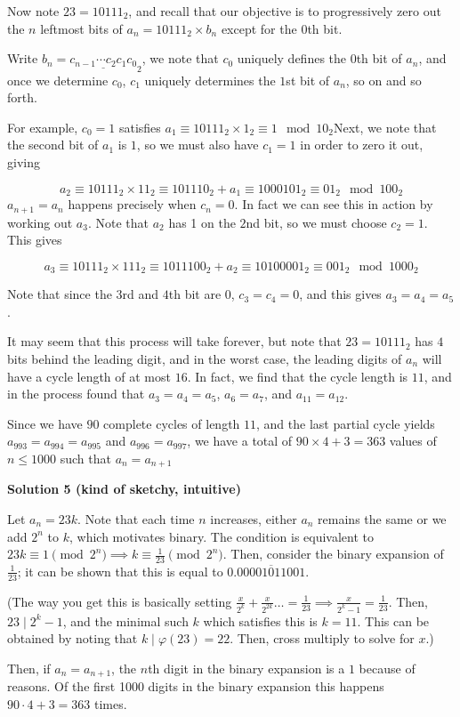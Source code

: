 \begin{enumerate}
 Now note $23 = 10111_2$, and recall that our objective is to progressively zero out the $n$ leftmost bits of $a_n = 10111_2 \times b_n$ except for the $0$th bit. 

 Write $b_n = \underline{c_{n-1}\cdots c_2c_1c_0}_2$, we note that $c_0$ uniquely defines the $0$th bit of $a_n$, and once we determine $c_0$, $c_1$ uniquely determines the $1$st bit of $a_n$, so on and so forth. 

 For example, $c_0 = 1$ satisfies $a_1 \equiv10111_2 \times 1_2 \equiv 1 \mod{10_2}$Next, we note that the second bit of $a_1$ is $1$, so we must also have $c_1 = 1$ in order to zero it out, giving

 
 \[a_2 \equiv 10111_2 \times 11_2 \equiv 101110_2 + a_1 \equiv 1000101_2 \equiv 01_2 \mod{100_2}\]
$a_{n+1} = a_{n}$ happens precisely when $c_n = 0$. In fact we can see this in action by working out $a_3$. Note that $a_2$ has 1 on the $2$nd bit, so we must choose $c_2 = 1$. This gives 

 
 \[a_3 \equiv 10111_2 \times 111_2 \equiv 1011100_2 + a_2 \equiv 10100001_2 \equiv 001_2 \mod{1000_2}\]

 Note that since the $3$rd and $4$th bit are $0$, $c_3 = c_4 = 0$, and this gives $a_3 = a_4 = a_5$.

 
It may seem that this process will take forever, but note that $23 = 10111_2$ has $4$ bits behind the leading digit, and in the worst case, the leading digits of $a_n$ will have a cycle length of at most $16$. In fact, we find that the cycle length is $11$, and in the process found that $a_3 = a_4 = a_5$, $a_6 = a_7$, and $a_{11} = a_{12}$.

 Since we have $90$ complete cycles of length $11$, and the last partial cycle yields $a_{993} = a_{994} = a_{995}$ and $a_{996} = a_{997}$, we have a total of $90 \times 4 + 3 = \boxed{363}$ values of $n \le 1000$ such that $a_n = a_{n+1}$




\textbf{Solution 5 (kind of sketchy, intuitive)}

Let $a_n=23k$. Note that each time $n$ increases, either $a_n$ remains the same or we add $2^n$ to $k$, which motivates binary. The condition is equivalent to $23k \equiv 1 \pmod{2^n} \implies k \equiv \frac{1}{23} \pmod{2^n}$. Then, consider the binary expansion of $\frac{1}{23}$; it can be shown that this is equal to $0.\overline{00001011001}$. 

 


 (The way you get this is basically setting $\frac{x}{2^k} + \frac{x}{2^{2k}} \ldots = \frac{1}{23} \implies \frac{x}{2^k-1} = \frac{1}{23}$. Then, $23 \mid 2^k-1$, and the minimal such $k$ which satisfies this is $k=11$. This can be obtained by noting that $k \mid \varphi(23) = 22$. Then, cross multiply to solve for $x$.) 

 


 Then, if $a_n = a_{n+1}$, the $n$th digit in the binary expansion is a $1$ because of reasons. Of the first 1000 digits in the binary expansion this happens $90 \cdot 4 + 3 = \boxed{363}$ times.

 


 


 


\end{enumerate}